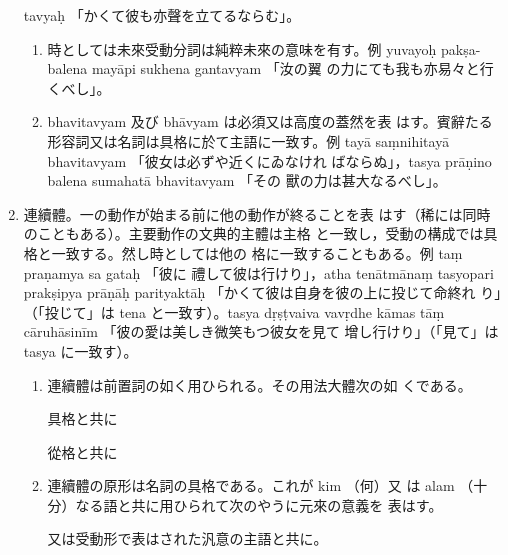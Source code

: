 \begin{enumerate}[label=(\arabic*)]
tavyaḥ 「かくて彼も亦聲を立てるならむ」。
\begin{enumerate}[label=(\alph*)]
\item 時としては未來受動分詞は純粹未來の意味を有す。例
yuvayoḥ pakṣa-balena mayāpi sukhena gantavyam 「汝の翼
の力にても我も亦易々と行くべし」。
\item bhavitavyam 及び bhāvyam は必須又は高度の蓋然を表
はす。賓辭たる形容詞又は名詞は具格に於て主語に一致す。例
tayā saṃnihitayā bhavitavyam 「彼女は必ずや近くにゐなけれ
ばならぬ」，tasya prāṇino balena sumahatā bhavitavyam 「その
獸の力は甚大なるべし」。
\end{enumerate}
\item 連續體。一の動作が始まる前に他の動作が終ることを表
はす（稀には同時のこともある）。主要動作の文典的主體は主格
と一致し，受動の構成では具格と一致する。然し時としては他の
格に一致することもある。例 taṃ praṇamya sa gataḥ 「彼に
禮して彼は行けり」，atha tenātmānaṃ tasyopari prakṣipya
prāṇāḥ parityaktāḥ 「かくて彼は自身を彼の上に投じて命終れ
り」（「投じて」は tena と一致す）。tasya dṛṣṭvaiva vavṛdhe
kāmas tāṃ cāruhāsinīm 「彼の愛は美しき微笑もつ彼女を見て
增し行けり」（「見て」は tasya に一致す）。
\begin{enumerate}[label=(\alph*)]
\item 連續體は前置詞の如く用ひられる。その用法大體次の如
くである。

具格と共に






從格と共に

\item 連續體の原形は名詞の具格である。これが kim （何）又
は alam （十分）なる語と共に用ひられて次のやうに元來の意義を
表はす。



又は受動形で表はされた汎意の主語と共に。

\end{enumerate}
\end{enumerate}

